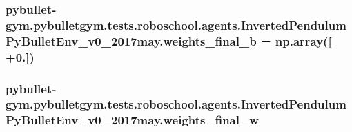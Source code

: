 \subsubsection[{\texorpdfstring{weights\+\_\+final\+\_\+b}{weights_final_b}}]{\setlength{\rightskip}{0pt plus 5cm}pybullet-\/gym.\+pybulletgym.\+tests.\+roboschool.\+agents.\+Inverted\+Pendulum\+Py\+Bullet\+Env\+\_\+v0\+\_\+2017may.\+weights\+\_\+final\+\_\+b = np.\+array(\mbox{[} +0.\mbox{]})}\hypertarget{namespacepybullet-gym_1_1pybulletgym_1_1tests_1_1roboschool_1_1agents_1_1_inverted_pendulum_py_bullet_env__v0__2017may_abc66b4bd2e957b80c7a48a7146a10aa1}{}\label{namespacepybullet-gym_1_1pybulletgym_1_1tests_1_1roboschool_1_1agents_1_1_inverted_pendulum_py_bullet_env__v0__2017may_abc66b4bd2e957b80c7a48a7146a10aa1}
\subsubsection[{\texorpdfstring{weights\+\_\+final\+\_\+w}{weights_final_w}}]{\setlength{\rightskip}{0pt plus 5cm}pybullet-\/gym.\+pybulletgym.\+tests.\+roboschool.\+agents.\+Inverted\+Pendulum\+Py\+Bullet\+Env\+\_\+v0\+\_\+2017may.\+weights\+\_\+final\+\_\+w}\hypertarget{namespacepybullet-gym_1_1pybulletgym_1_1tests_1_1roboschool_1_1agents_1_1_inverted_pendulum_py_bullet_env__v0__2017may_ac065d1f1146341d45213730b83418ac1}{}\label{namespacepybullet-gym_1_1pybulletgym_1_1tests_1_1roboschool_1_1agents_1_1_inverted_pendulum_py_bullet_env__v0__2017may_ac065d1f1146341d45213730b83418ac1}

